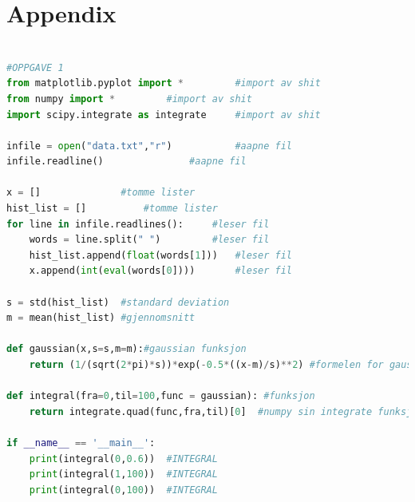 \pagebreak

\section*{Appendix}


\begin{lstlisting}[language=python]

#OPPGAVE 1
from matplotlib.pyplot import *			#import av shit
from numpy import *			#import av shit
import scipy.integrate as integrate		#import av shit

infile = open("data.txt","r")			#aapne fil
infile.readline()				#aapne fil

x = []				#tomme lister
hist_list = []			#tomme lister
for line in infile.readlines():		#leser fil
	words = line.split(" ")			#leser fil
	hist_list.append(float(words[1]))	#leser fil
	x.append(int(eval(words[0])))		#leser fil

s = std(hist_list) 	#standard deviation
m = mean(hist_list) #gjennomsnitt

def gaussian(x,s=s,m=m):#gaussian funksjon
	return (1/(sqrt(2*pi)*s))*exp(-0.5*((x-m)/s)**2) #formelen for gaussianfordeling

def integral(fra=0,til=100,func = gaussian): #funksjon
	return integrate.quad(func,fra,til)[0]	#numpy sin integrate funksjon

if __name__ == '__main__':
	print(integral(0,0.6))	#INTEGRAL
	print(integral(1,100))	#INTEGRAL
	print(integral(0,100))	#INTEGRAL
\end{lstlisting}








